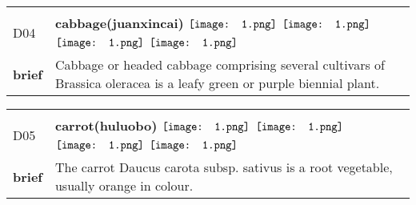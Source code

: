 \documentclass[UTF8]{article}
\begin{document}
            \begin{tabularx}{\textwidth}{p{1.5cm}X}
            \arrayrulecolor{myBlue}
        	\hline\\
            \small{D04}&
            \large{\bfseries{cabbage(juanxincai)}}\hfill
                                                            \phantom{$\vcenter{\hbox{\texttt{[image: 1.png]}}}$}
                                                                \phantom{$\vcenter{\hbox{\texttt{[image: 1.png]}}}$}
                                                                $\vcenter{\hbox{\texttt{[image: 1.png]}}}$
                                                                $\vcenter{\hbox{\texttt{[image: 1.png]}}}$
                                                                \phantom{$\vcenter{\hbox{\texttt{[image: 1.png]}}}$}
                                                                $\vcenter{\hbox{\texttt{[image: 1.png]}}}$
                                                                $\vcenter{\hbox{\texttt{[image: 1.png]}}}$
                                        \\[10pt]
            \large{\bfseries{brief}}&\noindent\parbox[c]{\hsize}{Cabbage or headed cabbage comprising several cultivars of Brassica oleracea is a leafy green or purple biennial plant. } \\[5pt]
            \hline\\[-10pt]
        \end{tabularx}
            \begin{tabularx}{\textwidth}{p{1.5cm}X}
            \arrayrulecolor{myBlue}
        	\hline\\
            \small{D05}&
            \large{\bfseries{carrot(huluobo)}}\hfill
                                                            \phantom{$\vcenter{\hbox{\texttt{[image: 1.png]}}}$}
                                                                \phantom{$\vcenter{\hbox{\texttt{[image: 1.png]}}}$}
                                                                $\vcenter{\hbox{\texttt{[image: 1.png]}}}$
                                                                $\vcenter{\hbox{\texttt{[image: 1.png]}}}$
                                                                \phantom{$\vcenter{\hbox{\texttt{[image: 1.png]}}}$}
                                                                $\vcenter{\hbox{\texttt{[image: 1.png]}}}$
                                                                $\vcenter{\hbox{\texttt{[image: 1.png]}}}$
                                        \\[10pt]
            \large{\bfseries{brief}}&\noindent\parbox[c]{\hsize}{The carrot Daucus carota subsp. sativus is a root vegetable, usually orange in colour. } \\[5pt]
            \hline\\[-10pt]
        \end{tabularx}
\end{document}

